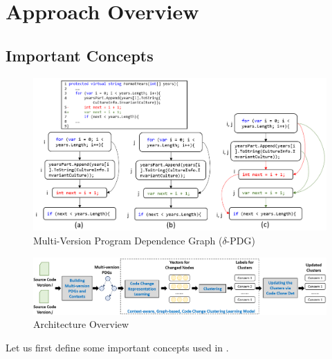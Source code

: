 \section{Approach Overview}
\label{overview:sec}

\subsection{Important Concepts}
\label{concepts:sec}

\begin{figure}[t]
	\centering
	\includegraphics[width=5.3in]{figures/multi-version-graph-3.png}
	\vspace{-6pt}
	\caption{Multi-Version Program Dependence Graph ($\delta$-PDG)}
	\label{fig:multi-version-pdg}
\end{figure}

\begin{figure}[t]
	\centering
 	\includegraphics[width=6.5in]{figures/overview.png}
	\vspace{-6pt}
	\caption{Architecture Overview}
	\label{fig:overview}
\end{figure}

Let us first define some important concepts used in {\tool}.


